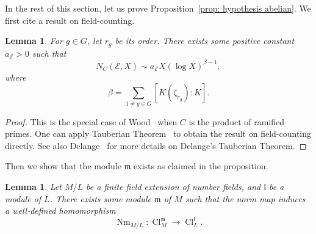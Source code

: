 \documentclass{amsart}
\numberwithin{equation}{section}
\theoremstyle{plain}
\newtheorem{lemma}[theorem]{Lemma}
\theoremstyle{definition}
\theoremstyle{remark}
\begin{document}
In the rest of this section, let us prove Proposition~\ref{prop: hypothesis abelian}.
We first cite a result on field-counting.
\begin{lemma}\label{lemma: field-counting of abelian extensions in general}
	For $g\in G$, let $r_g$ be its order.
	There exists some positive constant $a_{\mathcal{E}}>0$ such that
	\begin{equation*}
		N_{C}(\mathcal{E},X)\sim a_{\mathcal{E}}X(\log X)^{\beta-1},
	\end{equation*}
	where
	\begin{equation*}
		\beta=\sum_{1\neq g\in G}[K(\zeta_{r_g}):K].
	\end{equation*}
\end{lemma}
\begin{proof}
	This is the special case of Wood~\cite[Lemma 2.9]{wood2010probabilities} when $C$ is the product of ramified primes.
	One can apply Tauberian Theorem~\cite[Appendix II Theorem I]{narkiewicz2014elementary} to obtain the result on field-counting directly.
	See also Delange~\cite{Delange54} for more details on Delange's Tauberian Theorem.
\end{proof}
Then we show that the module $\mathfrak{m}$ exists as claimed in the proposition.
\begin{lemma}\label{lemma: a suitable module of K}
	Let $M/L$ be a finite field extension of number fields, and $\mathfrak{l}$ be a module of $L$.
	There exists some module $\mathfrak{m}$ of $M$ such that the norm map induces a well-defined homomorphism
	\begin{equation*}
		\operatorname{Nm}_{M/L}:\operatorname{Cl}_M^{\mathfrak{m}}\to\operatorname{Cl}_{L}^{\mathfrak{l}}.
	\end{equation*}
\end{lemma}
\end{document}
